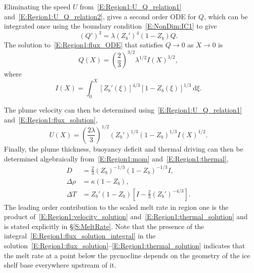 \documentclass{jfm}
\begin{document}
Eliminating the speed $U$ from~\eqref{E:Region1:U_Q_relation1} and~\eqref{E:Region1:U_Q_relation2}, gives a second order ODE for $Q$, which can be integrated once using the boundary condition~\eqref{E:NonDim:IC1} to give
\begin{equation}\label{E:Region1:flux_ODE}
(Q')^3 = \lambda\left(Z_b'\right)^4 \left(1-Z_b\right)Q.
\end{equation}
The solution to~\eqref{E:Region1:flux_ODE} that satisfies $Q \to 0$ as $X \to 0$ is
\begin{equation}\label{E:Region1:flux_solution}
Q(X) =  \left(\frac{2}{3}\right)^{3/2} \lambda^{1/2}I(X)^{3/2},
\end{equation}
where 
\begin{equation}\label{E:Region1:flux_solution_integral}
I(X) =  \int_0^X \left[Z_b'(\xi)\right]^{4/3}\left[1 - Z_b(\xi)\right]^{1/3}~\mathrm{d}\xi.
\end{equation}

The plume velocity can then be determined using~\eqref{E:Region1:U_Q_relation1} and~\eqref{E:Region1:flux_solution},
\begin{equation}\label{E:Region1:velocity_solution}
U(X) =\left(\frac{2\lambda}{3}\right)^{1/2}\left(Z_b'\right)^{1/3}\left(1 - Z_b\right)^{1/3}I(X)^{1/2}.
\end{equation}
Finally, the plume thickness, buoyancy deficit and thermal driving can then be determined algebraically from~\eqref{E:Region1:mom} and~\eqref{E:Region1:thermal},
\begin{align}
D &= \frac{2}{3}\left(Z_b\right)^{-1/3}\left(1 - Z_b\right)^{-1/3}I,\label{E:Region1:thickness_solution}\\
\Delta \rho &= \kappa \left( 1- Z_b\right),\label{E:Region1:buoyancy_solution}\\
\Delta T &= Z_b'\left(1 - Z_b\right)\left[I - \frac{2}{3}\left(Z_b'\right)^{-4/3}\right].\label{E:Region1:thermal_solution}
\end{align}
The leading order contribution to the scaled melt rate in region one is the product of~\eqref{E:Region1:velocity_solution} and~\eqref{E:Region1:thermal_solution} and is stated explicitly in \S\ref{S:MeltRate}. Note that the presence of the integral~\eqref{E:Region1:flux_solution_integral}  in the solution~\eqref{E:Region1:flux_solution}--\eqref{E:Region1:thermal_solution} indicates that the melt rate at a point below the pycnocline depends on the geometry of the ice shelf base everywhere upstream of it.
\end{document}
